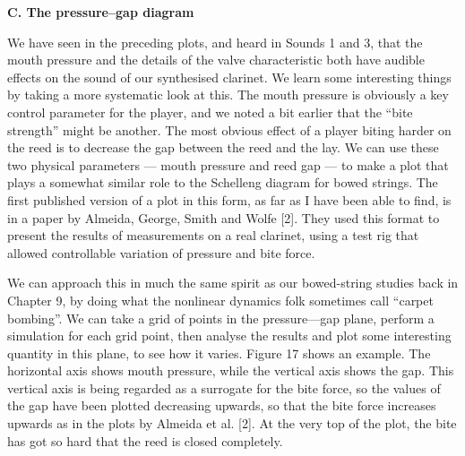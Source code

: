 \audio{}



\audio{}


  \textbf{C. The pressure--gap diagram} 

  We have seen in the preceding plots, and heard in Sounds 1 and 3, that the 
  mouth pressure and the details of the valve characteristic both have audible 
  effects on the sound of our synthesised clarinet. We learn some interesting 
  things by taking a more systematic look at this. The mouth pressure is 
  obviously a key control parameter for the player, and we noted a bit earlier 
  that the “bite strength” might be another. The most obvious effect of a 
  player biting harder on the reed is to decrease the gap between the reed and 
  the lay. We can use these two physical parameters — mouth pressure and reed 
  gap — to make a plot that plays a somewhat similar role to the Schelleng 
  diagram for bowed strings. The first published version of a plot in this 
  form, as far as I have been able to find, is in a paper by Almeida, George, 
  Smith and Wolfe [2]. They used this format to present the results of 
  measurements on a real clarinet, using a test rig that allowed controllable 
  variation of pressure and bite force. 

  We can approach this in much the same spirit as our bowed-string studies back 
  in Chapter 9, by doing what the nonlinear dynamics folk sometimes call 
  “carpet bombing”. We can take a grid of points in the pressure—gap plane, 
  perform a simulation for each grid point, then analyse the results and plot 
  some interesting quantity in this plane, to see how it varies. Figure 17 
  shows an example. The horizontal axis shows mouth pressure, while the 
  vertical axis shows the gap. This vertical axis is being regarded as a 
  surrogate for the bite force, so the values of the gap have been plotted 
  decreasing upwards, so that the bite force increases upwards as in the plots 
  by Almeida et al. [2]. At the very top of the plot, the bite has got so hard 
  that the reed is closed completely. 

